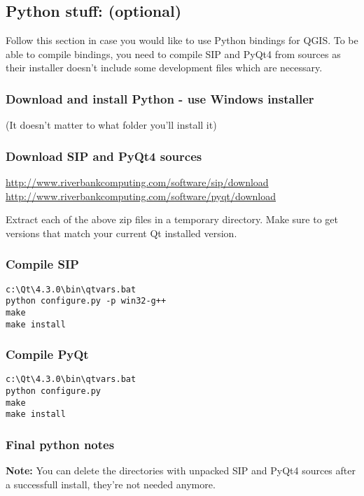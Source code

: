 \subsection{Python stuff: (optional)}
Follow this section in case you would like to use Python bindings for QGIS.  To
be able to compile bindings, you need to compile SIP and PyQt4 from sources as
their installer doesn't include some development files which are necessary.

\subsubsection{Download and install Python - use Windows installer}
(It doesn't matter to what folder you'll install it)


\subsubsection{Download SIP and PyQt4 sources}
\url{http://www.riverbankcomputing.com/software/sip/download} \\
\url{http://www.riverbankcomputing.com/software/pyqt/download}

Extract each of the above zip files in a temporary directory. Make sure
to get versions that match your current Qt installed version.

\subsubsection{Compile SIP}
\begin{verbatim}
c:\Qt\4.3.0\bin\qtvars.bat 
python configure.py -p win32-g++ 
make 
make install 
\end{verbatim}

\subsubsection{Compile PyQt}
\begin{verbatim}
c:\Qt\4.3.0\bin\qtvars.bat 
python configure.py 
make 
make install 
\end{verbatim}

\subsubsection{Final python notes}

\textbf{Note:} You can delete the directories with unpacked SIP and PyQt4 sources after a
successfull install, they're not needed anymore.

